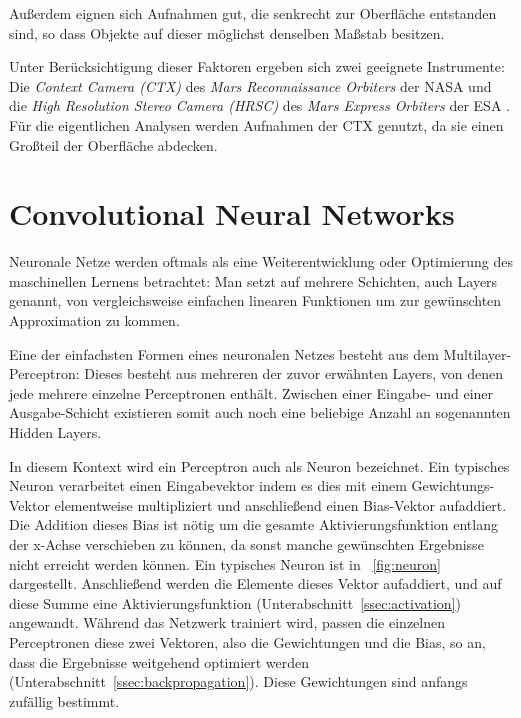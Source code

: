 Außerdem eignen sich Aufnahmen gut, die senkrecht zur Oberfläche entstanden sind, so dass Objekte auf dieser möglichst denselben Maßstab besitzen.

Unter Berücksichtigung dieser Faktoren ergeben sich \ua zwei geeignete Instrumente:
Die \textit{Context Camera (CTX)} des \textit{Mars Reconnaissance Orbiters} der NASA \cite{malin_07} und die \textit{High Resolution Stereo Camera (HRSC)} des \textit{Mars Express Orbiters} der ESA \cite{hrsc}. Für die eigentlichen Analysen werden Aufnahmen der CTX genutzt, da sie einen Großteil der Oberfläche abdecken.%

\section{Convolutional Neural Networks}
\label{sec:cnn}

Neuronale Netze werden oftmals als eine Weiterentwicklung oder Optimierung des maschinellen Lernens betrachtet: Man setzt auf mehrere Schichten, auch Layers genannt, von vergleichsweise einfachen linearen Funktionen um zur gewünschten Approximation zu kommen. \cite{hardesty_17}

Eine der einfachsten Formen eines neuronalen Netzes besteht aus dem Multilayer-Perceptron: Dieses besteht aus mehreren der zuvor erwähnten Layers, von denen jede mehrere einzelne Perceptronen enthält. Zwischen einer Eingabe- und einer Ausgabe-Schicht existieren somit auch noch eine beliebige Anzahl an sogenannten Hidden Layers.

In diesem Kontext wird ein Perceptron auch als Neuron bezeichnet. Ein typisches Neuron verarbeitet einen Eingabevektor indem es dies mit einem Gewichtungs-Vektor elementweise multipliziert und anschließend einen Bias-Vektor aufaddiert. Die Addition dieses Bias ist nötig um die gesamte Aktivierungsfunktion entlang der x-Achse verschieben zu können, da sonst manche gewünschten Ergebnisse nicht erreicht werden können. \cite{bias} Ein typisches Neuron ist in \figurename~\ref{fig:neuron} dargestellt. Anschließend werden die Elemente dieses Vektor aufaddiert, und auf diese Summe eine Aktivierungsfunktion (\vgl Unterabschnitt~\ref{ssec:activation}) angewandt. Während das Netzwerk trainiert wird, passen die einzelnen Perceptronen diese zwei Vektoren, also die Gewichtungen und die Bias, so an, dass die Ergebnisse weitgehend optimiert werden (\vgl Unterabschnitt~\ref{ssec:backpropagation}). Diese Gewichtungen sind anfangs zufällig bestimmt. \cite{hardesty_17, cs231n} 

